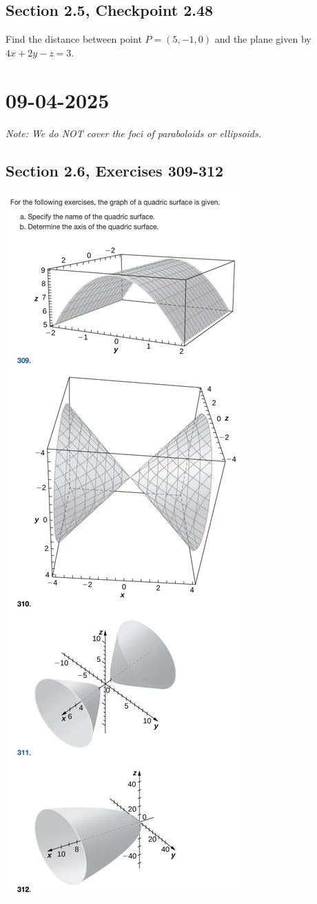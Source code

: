 \documentclass[]{mangos-musings}
\begin{document}
\subsection{Section 2.5, Checkpoint 2.48}
Find the distance between point $P=(5,-1,0)$ and the plane given by $4x+2y-z=3$.

\newpage
\section{09-04-2025}
\textit{Note: We do NOT cover the foci of paraboloids or ellipsoids.}
\subsection{Section 2.6, Exercises 309-312}
\includegraphics[scale=0.7]{assets/rec04-ex309-312.png}
\end{document}
